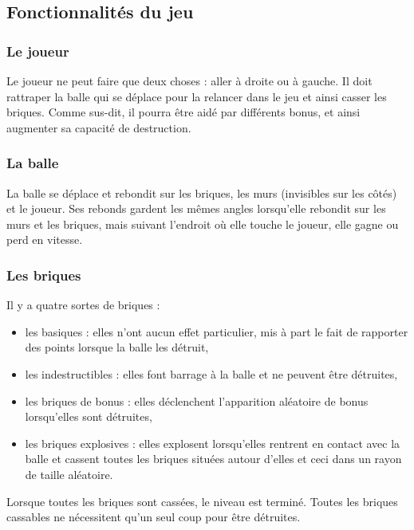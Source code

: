\documentclass[a4paper,10pt]{article}
\begin{document}
\subsection{Fonctionnalités du jeu}
    \subsubsection{Le joueur}
        Le joueur ne peut faire que deux choses : aller à droite ou à gauche. Il doit rattraper la balle
        qui se déplace pour la relancer dans le jeu et ainsi casser les briques. Comme sus-dit, il pourra
        être aidé par différents bonus, et ainsi augmenter sa capacité de destruction.

	\newpage
    \subsubsection{La balle}
        La balle se déplace et rebondit sur les briques, les murs (invisibles sur les côtés) et le joueur.
        Ses rebonds gardent les mêmes angles lorsqu'elle rebondit sur les murs et les briques, mais suivant
        l'endroit où elle touche le joueur, elle gagne ou perd en vitesse.

    \subsubsection{Les briques}
        Il y a quatre sortes de briques :
        \begin{itemize}
            \item les basiques : elles n'ont aucun effet particulier, mis à part le fait de rapporter des points lorsque la balle les détruit,
            \item les indestructibles : elles font barrage à la balle et ne peuvent être détruites,
            \item les briques de bonus : elles déclenchent l'apparition aléatoire de bonus lorsqu'elles sont détruites,
            \item les briques explosives : elles explosent lorsqu'elles rentrent en contact avec la balle et cassent toutes les briques situées autour d'elles
                    et ceci dans un rayon de taille aléatoire.
        \end{itemize}

        Lorsque toutes les briques sont cassées, le niveau est terminé. Toutes les briques cassables
        ne nécessitent qu'un seul coup pour être détruites.
\end{document}
